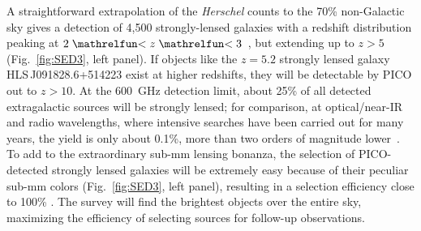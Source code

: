 \documentclass[PICOReport.tex]{subfiles}
\begin{document}
A straightforward extrapolation of the \textit{Herschel} counts to the 70\% non-Galactic sky gives a detection of 4,500 strongly-lensed galaxies with a redshift distribution peaking at $2\simlt z \simlt 3$~\cite{Negrello2017lensed}, but extending up to $z> 5$ (Fig.~\ref{fig:SED3}, left panel).
If objects like the $z=5.2$ strongly lensed galaxy HLS\,J091828.6+514223 exist at higher redshifts, they will be detectable by PICO out to $z>10$. At the 600~GHz detection limit, about 25\% of all detected extragalactic sources will be strongly lensed; for comparison, at optical/near-IR and radio wavelengths, where intensive searches have been carried out for many years, the yield is only about 0.1\%, more than two orders of magnitude lower~\cite{Treu2010}. To add to the extraordinary sub-mm lensing bonanza, the selection of PICO-detected strongly lensed galaxies will be extremely easy because of their peculiar sub-mm colors (Fig.~\ref{fig:SED3}, left panel), resulting in a selection efficiency close to 100\% \citep{Negrello2010}. The survey will find the brightest objects over the entire sky, maximizing the efficiency of selecting sources for follow-up observations. 
\end{document}
